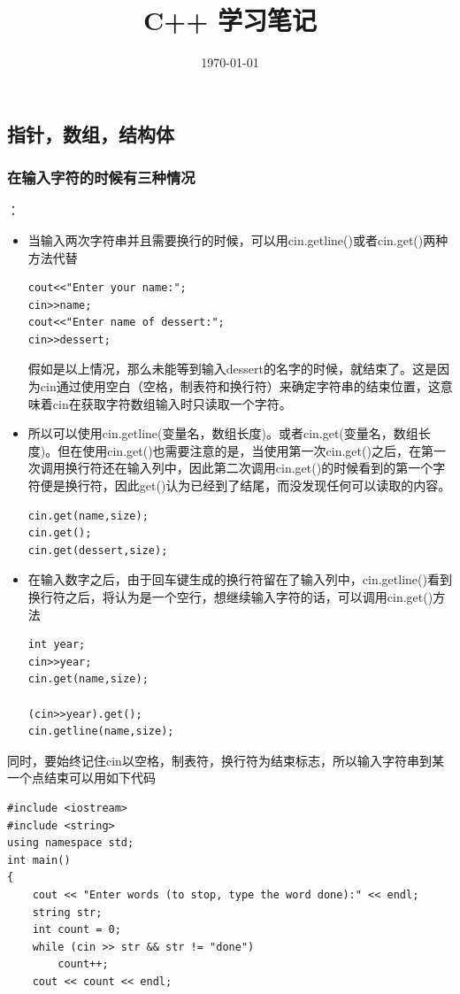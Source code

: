 \documentclass[a4paper,12pt]{article}
\begin{document}
\title{C++ 学习笔记}
\date{\today}
\maketitle
\begin{spacing}{2}
\tableofcontents
\newpage
{}
\end{spacing}
\begin{spacing}{2}
\section{指针，数组，结构体}
\subsubsection{在输入字符的时候有三种情况}：
\begin{itemize}
\item 当输入两次字符串并且需要换行的时候，可以用cin.getline()或者cin.get()两种方法代替
\begin{lstlisting}
cout<<"Enter your name:";
cin>>name;
cout<<"Enter name of dessert:";
cin>>dessert;
\end{lstlisting}
假如是以上情况，那么未能等到输入dessert的名字的时候，就结束了。这是因为cin通过使用空白（空格，制表符和换行符）来确定字符串的结束位置，这意
味着cin在获取字符数组输入时只读取一个字符。
\item 所以可以使用cin.getline(变量名，数组长度)。或者cin.get(变量名，数组长度)。但在使用cin.get()也需要注意的是，当使用第一次cin.get()之后，在第一次调用换行符还在输入列中，因此第二次调用cin.get()的时候看到的第一个字符便是换行符，因此get()认为已经到了结尾，而没发现任何可以读取的内容。
\begin{lstlisting}
cin.get(name,size);
cin.get();
cin.get(dessert,size);
\end{lstlisting}
\item 在输入数字之后，由于回车键生成的换行符留在了输入列中，cin.getline()看到换行符之后，将认为是一个空行，想继续输入字符的话，可以调用cin.get()方法
\begin{lstlisting}
int year;
cin>>year;
cin.get(name,size);

(cin>>year).get();
cin.getline(name,size);
\end{lstlisting}
\end{itemize}
同时，要始终记住cin以空格，制表符，换行符为结束标志，所以输入字符串到某一个点结束可以用如下代码
\begin{lstlisting}
#include <iostream>  
#include <string>  
using namespace std;
int main()
{
    cout << "Enter words (to stop, type the word done):" << endl;
    string str;
    int count = 0;
    while (cin >> str && str != "done")
        count++;
    cout << count << endl;


\end{lstlisting}
\end{spacing}
\end{document}
